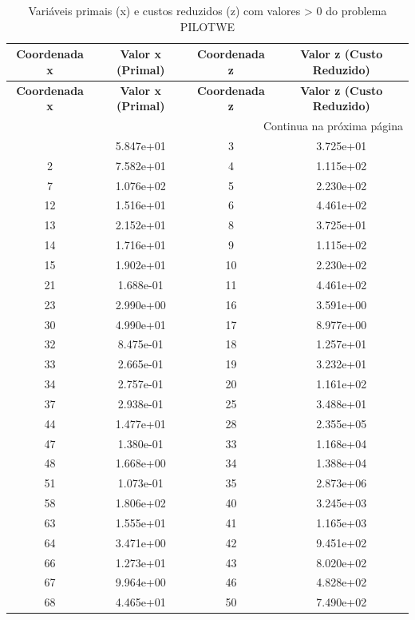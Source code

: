 \documentclass[12pt]{article}
\begin{document}
\begin{longtable}{@{}cccc@{}}
\caption{Variáveis primais (x) e custos reduzidos (z) com valores > 0 do problema PILOTWE} \\
\toprule
\textbf{Coordenada x} & \textbf{Valor x (Primal)} & \textbf{Coordenada z} & \textbf{Valor z (Custo Reduzido)} \\
\midrule
\endfirsthead

\toprule
\textbf{Coordenada x} & \textbf{Valor x (Primal)} & \textbf{Coordenada z} & \textbf{Valor z (Custo Reduzido)} \\
\midrule
\endhead

\midrule \multicolumn{4}{r}{{Continua na próxima página}} \\ \midrule
\endfoot

\bottomrule
\endlastfoot
1 & 5.847e+01 & 3 & 3.725e+01 \\
2 & 7.582e+01 & 4 & 1.115e+02 \\
7 & 1.076e+02 & 5 & 2.230e+02 \\
12 & 1.516e+01 & 6 & 4.461e+02 \\
13 & 2.152e+01 & 8 & 3.725e+01 \\
14 & 1.716e+01 & 9 & 1.115e+02 \\
15 & 1.902e+01 & 10 & 2.230e+02 \\
21 & 1.688e-01 & 11 & 4.461e+02 \\
23 & 2.990e+00 & 16 & 3.591e+00 \\
30 & 4.990e+01 & 17 & 8.977e+00 \\
32 & 8.475e-01 & 18 & 1.257e+01 \\
33 & 2.665e-01 & 19 & 3.232e+01 \\
34 & 2.757e-01 & 20 & 1.161e+02 \\
37 & 2.938e-01 & 25 & 3.488e+01 \\
44 & 1.477e+01 & 28 & 2.355e+05 \\
47 & 1.380e-01 & 33 & 1.168e+04 \\
48 & 1.668e+00 & 34 & 1.388e+04 \\
51 & 1.073e-01 & 35 & 2.873e+06 \\
58 & 1.806e+02 & 40 & 3.245e+03 \\
63 & 1.555e+01 & 41 & 1.165e+03 \\
64 & 3.471e+00 & 42 & 9.451e+02 \\
66 & 1.273e+01 & 43 & 8.020e+02 \\
67 & 9.964e+00 & 46 & 4.828e+02 \\
68 & 4.465e+01 & 50 & 7.490e+02 \\

\end{longtable}
\end{document}
